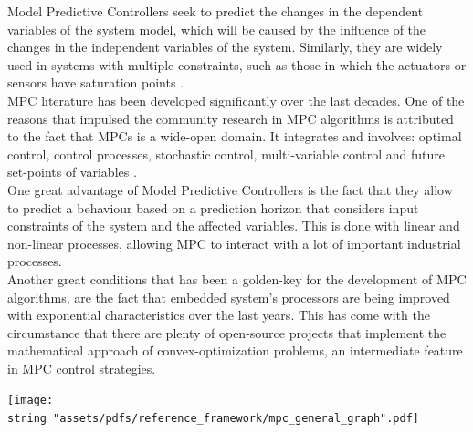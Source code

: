 \documentclass[11pt]{report} %
\begin{document}
Model Predictive Controllers seek to predict the changes in the dependent variables of the system model, which will be caused by the influence of the changes in the independent variables of the system. Similarly, they are widely used in systems with multiple constraints, such as those in which the actuators or sensors have saturation points \citep{cite_mpc_industrial_processes_automation_systems}.\\

MPC literature has been developed significantly over the last decades. One of the reasons that impulsed the community research in MPC algorithms is attributed to the fact that MPCs is a wide-open domain. It integrates and involves: optimal control, control processes, stochastic control, multi-variable control and future set-points of variables \citep{cite_model_predictive_control_camacho_bordons}.\\ 

One great advantage of Model Predictive Controllers is the fact that they allow to predict a behaviour based on a prediction horizon that considers input constraints of the system and the affected variables. This is done with linear and non-linear processes, allowing MPC to interact with a lot of important industrial processes.\\

Another great conditions that has been a golden-key for the development of MPC algorithms, are the fact that embedded system's processors are being improved with exponential characteristics over the last years. This has come with the circumstance that there are plenty of open-source projects that implement the mathematical approach of convex-optimization problems, an intermediate feature in MPC control strategies.\\


\begin{center}
\texttt{[image: \\string "assets/pdfs/reference\_framework/mpc\_general\_graph".pdf]}
\bigbreak
\begin{minipage}{\linewidth} %
\label{fig_general_mpc_explained_plot_thermal_article}
\end{minipage} \end{center}




\end{document}
